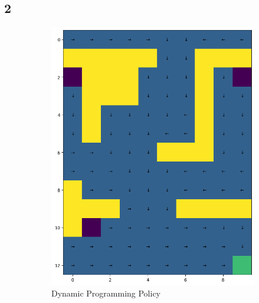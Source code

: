 \documentclass[12pt,a4paper]{report}
\begin{document}
\subsection*{2}
\begin{figure}[H]
    \centering
    \begin{subfigure}[b]{0.49\textwidth}
        \centering
        \includegraphics[width=\textwidth]{assets/dp/dp_optimal_policy.png}        
        \caption{Dynamic Programming Policy}
    \end{subfigure}
    \hfill 
    \begin{subfigure}[b]{0.49\textwidth}
        \centering

\end{subfigure}
\end{figure}
\end{document}

